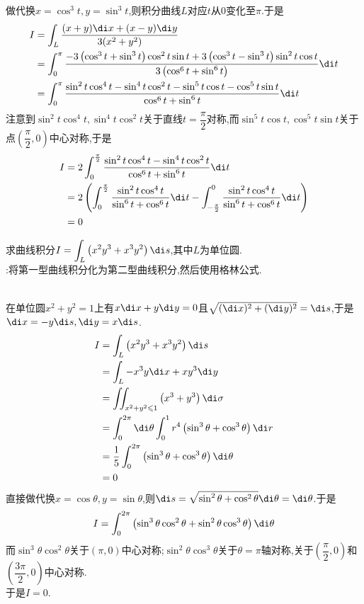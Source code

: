 \documentclass{ctexart}
\begin{document}
\begin{solution}
    做代换$x=\cos^3t,y=\sin^3t$,则积分曲线$L$对应$t$从$0$变化至$\pi$.于是
    \[\begin{aligned}
        I
        &= \int_L\dfrac{(x+y)\di x+(x-y)\di y}{3(x^2+y^2)} \\
        &= \int_{0}^{\pi}\dfrac{-3\left(\cos^3 t+\sin^3 t\right)\cos^2t\sin t+3\left(\cos^3 t-\sin^3 t\right)\sin^2t\cos t}{3\left(\cos^6t+\sin^6t\right)}\di t \\
        &= \int_0^\pi\dfrac{\sin^2t\cos^4t-\sin^4t\cos^2t-\sin^5t\cos t-\cos^5t\sin t}{\cos^6t+\sin^6t}\di t
    \end{aligned}\]
    注意到$\sin^2t\cos^4t,\sin^4t\cos^2t$关于直线$t=\dfrac\pi2$对称,而$\sin^5t\cos t,\cos^5t\sin t$关于点$\left(\dfrac\pi2,0\right)$中心对称,于是
    \[\begin{aligned}
        I
        &= 2\int_0^{\frac\pi2}\dfrac{\sin^2t\cos^4t-\sin^4t\cos^2t}{\cos^6t+\sin^6t}\di t \\
        &= 2\left(\int_0^{\frac\pi2}\dfrac{\sin^2t\cos^4t}{\sin^6t+\cos^6t}\di t-\int_{-\frac\pi2}^{0}\dfrac{\sin^2t\cos^4t}{\sin^6t+\cos^6t}\di t\right) \\
        &= 0
    \end{aligned}\]
\end{solution}
\begin{problem}[L.5.3]
    求曲线积分$I=\displaystyle\int_L\left(x^2y^3+x^3y^2\right)\di s$,其中$L$为单位圆.\\
    :将第一型曲线积分化为第二型曲线积分,然后使用格林公式.
\end{problem}
\begin{solution}
    \\
    在单位圆$x^2+y^2=1$上有$x\di x+y\di y=0$且$\sqrt{(\di x)^2+(\di y)^2}=\di s$,于是$\di x=-y\di s,\di y=x\di s$.
    \[\begin{aligned}
        I
        &= \int_L\left(x^2y^3+x^3y^2\right)\di s \\
        &= \int_{L}-x^3y\di x+xy^3\di y \\
        &= \iint_{x^2+y^2\leqslant 1}\left(x^3+y^3\right)\di\sigma \\
        &= \int_0^{2\pi}\di\theta\int_{0}^{1}r^4\left(\sin^3\theta+\cos^3\theta\right)\di r \\
        &= \dfrac15\int_0^{2\pi}\left(\sin^3\theta+\cos^3\theta\right)\di\theta \\
        &= 0
    \end{aligned}\]
    直接做代换$x=\cos\theta,y=\sin\theta$,则$\di s=\sqrt{\sin^2\theta+\cos^2\theta}\di\theta=\di\theta$.于是
    \[\begin{aligned}
        I=\int_0^{2\pi}\left(\sin^3\theta\cos^2\theta+\sin^2\theta\cos^3\theta\right)\di\theta
    \end{aligned}\]
    而$\sin^3\theta\cos^2\theta$关于$(\pi,0)$中心对称;$\sin^2\theta\cos^3\theta$关于$\theta=\pi$轴对称,关于$\left(\dfrac\pi2,0\right)$和$\left(\dfrac{3\pi}{2},0\right)$中心对称.\\
    于是$I=0$.
\end{solution}
\end{document}
